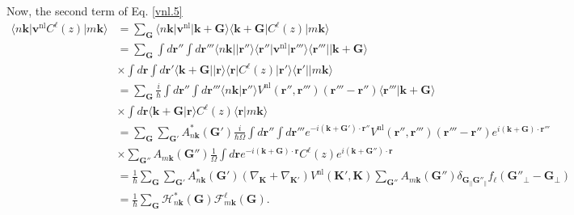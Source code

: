 Now, the second term of Eq. \eqref{vnl.5}
\begin{align}\label{vnl.12}
\langle n\mathbf{k}\vert 
\mathbf{v}^\mathrm{nl}
C^{\ell}(z) \vert m\mathbf{k}\rangle
&=\sum_{\mathbf{G}}
\langle n\mathbf{k}\vert 
\mathbf{v}^\mathrm{nl} 
\vert\mathbf{k}+\mathbf{G}\rangle
\langle\mathbf{k}+\mathbf{G}\vert C^{\ell}(z)
\vert m\mathbf{k}\rangle
\nonumber\\
&=\sum_{\mathbf{G}}
\int d\mathbf{r}'' 
\int d\mathbf{r}''' 
\langle n\mathbf{k}\vert 
\vert\mathbf{r}''\rangle\langle\mathbf{r}''\vert 
\mathbf{v}^\mathrm{nl} 
\vert\mathbf{r}'''\rangle\langle\mathbf{r}'''\vert
\vert\mathbf{k}+\mathbf{G}\rangle
\nonumber\\
&\times 
\int d\mathbf{r} 
\int d\mathbf{r}' 
\langle\mathbf{k}+\mathbf{G}\vert
\vert\mathbf{r}\rangle\langle\mathbf{r}\vert  
C^{\ell}(z) 
\vert\mathbf{r}'\rangle\langle\mathbf{r}'\vert
\vert m\mathbf{k}\rangle
\nonumber\\
&=\sum_{\mathbf{G}}
\frac{i}{\hbar}
\int d\mathbf{r}'' 
\int d\mathbf{r}''' 
\langle n\mathbf{k}\vert\mathbf{r}''\rangle
V^\mathrm{nl}(\mathbf{r}'',\mathbf{r}''')(\mathbf{r}'''-\mathbf{r}'') 
\langle\mathbf{r}'''\vert\mathbf{k}+\mathbf{G}\rangle
\nonumber\\
&\times 
\int d\mathbf{r} 
\langle\mathbf{k}+\mathbf{G}\vert\mathbf{r}\rangle
C^{\ell}(z) 
\langle\mathbf{r}\vert m\mathbf{k}\rangle
\nonumber\\
&=\sum_{\mathbf{G}}
\sum_{\mathbf{G}'}
A^{*}_{n\mathbf{k}}(\mathbf{G}') 
\frac{i}{\hbar\Omega}
\int d\mathbf{r}'' 
\int d\mathbf{r}''' 
e^{-i(\mathbf{k}+\mathbf{G}')\cdot\mathbf{r}''} 
V^\mathrm{nl}(\mathbf{r}'',\mathbf{r}''')(\mathbf{r}'''-\mathbf{r}'') 
e^{i(\mathbf{k}+\mathbf{G})\cdot\mathbf{r}'''}
\nonumber\\
&\times 
\sum_{\mathbf{G}''}
A_{m\mathbf{k}}(\mathbf{G}'') 
\frac{1}{\Omega}
\int d\mathbf{r} 
e^{-i(\mathbf{k}+\mathbf{G})\cdot\mathbf{r}} 
C^{\ell}(z) 
e^{i(\mathbf{k}+\mathbf{G}'')\cdot\mathbf{r}}
\nonumber\\
&=
\frac{1}{\hbar}
\sum_{\mathbf{G}}
\sum_{\mathbf{G}'}
A^{*}_{n\mathbf{k}}(\mathbf{G}') 
(\nabla_\mathbf{K}+\nabla_{\mathbf{K}'})
V^\mathrm{nl}(\mathbf{K}',\mathbf{K})
\sum_{\mathbf{G}''}
A_{m\mathbf{k}}(\mathbf{G}'') 
\delta_{\mathbf{G}_\parallel \mathbf{G}''_\parallel}f_\ell(\mathbf{G}''_\perp-\mathbf{G}_\perp)
\nonumber\\
&=
\frac{1}{\hbar}
\sum_{\mathbf{G}}
\mathcal{H}^{*}_{n\mathbf{k}}(\mathbf{G}) 
\mathcal{F}^{\ell}_{m\mathbf{k}}(\mathbf{G}) 
.
\end{align}
